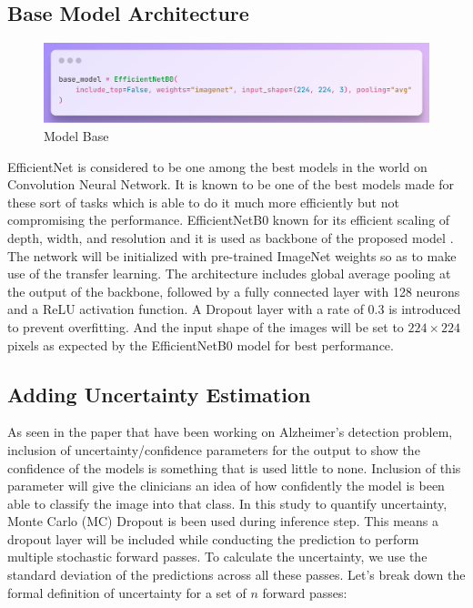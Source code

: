\documentclass[12pt,onecolumn]{report}
\begin{document}
\subsection{Base Model Architecture}
\begin{figure}[h!]
    \centering
    \includegraphics[width=0.8\columnwidth]{figures/res_model_base.png}  %
    \caption{Model Base} %
    \label{fig:base model} %
\end{figure}
EfficientNet is considered to be one among the best models in the world on Convolution Neural Network. It is known to be one of the best models made for these sort of tasks which is able to do it much more efficiently but not compromising the performance. EfficientNetB0 known for its efficient scaling of depth, width, and resolution and it is used as backbone of the proposed model \cite{2021Hoang}. The network will be initialized with pre-trained ImageNet weights so as to make use of the transfer learning. The architecture includes global average pooling at the output of the backbone, followed by a fully connected layer with 128 neurons and a ReLU activation function. A Dropout layer with a rate of 0.3 is introduced to prevent overfitting. And the input shape of the images will be set to $224 \times 224$ pixels as expected by the EfficientNetB0 model for best performance.

\subsection{Adding Uncertainty Estimation}
As seen in the paper that have been working on Alzheimer’s detection problem, inclusion of uncertainty/confidence parameters for the output to show the confidence of the models is something that is used little to none. Inclusion of this parameter will give the clinicians an idea of how confidently the model is been able to classify the image into that class. In this study to quantify uncertainty, Monte Carlo (MC) Dropout is been used during inference step. This means a dropout layer will be included while conducting the prediction to perform multiple stochastic forward passes. To calculate the uncertainty, we use the standard deviation of the predictions across all these passes. Let’s break down the formal definition of uncertainty for a set of $n$ forward passes:
\end{document}
